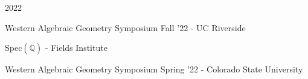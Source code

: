 \documentclass[../omelveny-cv]{subfiles}
\begin{document}


\begin{cventries}

    \cventry
    {}{2022}{}{}
    {
        \vspace{-0.5cm}
        \begin{cvitems}
            \item {Western Algebraic Geometry Symposium Fall '22 - UC Riverside}
            \item {Spec\((\overline{\mathbb{Q}})\) - Fields Institute}
            \item {Western Algebraic Geometry Symposium Spring '22 - Colorado State University}
        \end{cvitems}
    }



\end{cventries}
\end{document}
